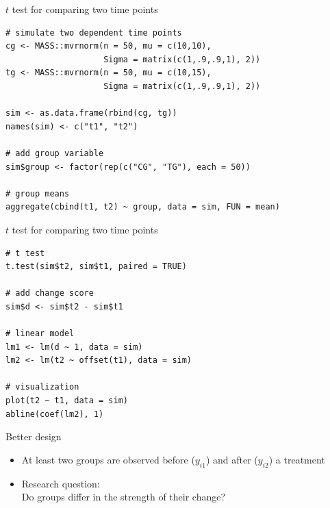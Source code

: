 \documentclass[aspectratio=169]{beamer}
\begin{document}
\begin{frame}[fragile]{$t$ test for comparing two time points}
\begin{lstlisting}
# simulate two dependent time points
cg <- MASS::mvrnorm(n = 50, mu = c(10,10),
                    Sigma = matrix(c(1,.9,.9,1), 2))
tg <- MASS::mvrnorm(n = 50, mu = c(10,15),
                    Sigma = matrix(c(1,.9,.9,1), 2))

sim <- as.data.frame(rbind(cg, tg))
names(sim) <- c("t1", "t2")

# add group variable
sim$group <- factor(rep(c("CG", "TG"), each = 50))

# group means
aggregate(cbind(t1, t2) ~ group, data = sim, FUN = mean)
\end{lstlisting}
\end{frame}

\begin{frame}[fragile]{$t$ test for comparing two time points}
\begin{lstlisting}
# t test
t.test(sim$t2, sim$t1, paired = TRUE)

# add change score
sim$d <- sim$t2 - sim$t1

# linear model
lm1 <- lm(d ~ 1, data = sim)
lm2 <- lm(t2 ~ offset(t1), data = sim)

# visualization
plot(t2 ~ t1, data = sim)
abline(coef(lm2), 1)
\end{lstlisting}
\end{frame}

\begin{frame}{Better design}
\begin{itemize}
    \item At least two groups are observed before ($y_{i1}$) and after
      ($y_{i2}$) a treatment
        \begin{center}
        \end{center}
      \item Research question:\\
      Do groups differ in the strength of their change?
\end{itemize}
\end{frame}
\end{document}

